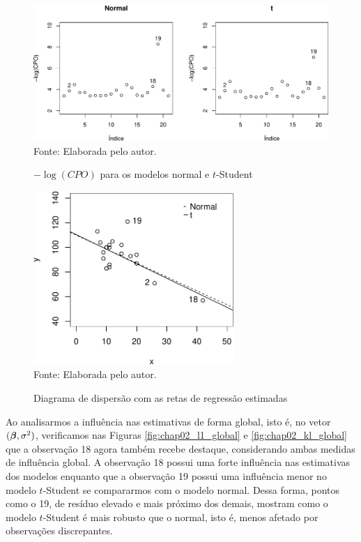 \begin{figure}[h]
\begin{center}
\caption{$-\log(CPO)$ para os modelos normal e $t$-Student}
\label{fig:chap02_cpo}
\includegraphics[width=\textwidth]{figuras/chap02_cpo.pdf}
\\ Fonte: Elaborada pelo autor.
\end{center}
\end{figure}

\begin{figure}[h]
\begin{center}
\caption{Diagrama de dispersão com as retas de regressão estimadas}
\label{fig:chap02_scatter_w_regs}
\includegraphics[width=3in]{figuras/chap02_scatter_w_regs-crop.pdf}
\\ Fonte: Elaborada pelo autor.
\end{center}
\end{figure}

Ao analisarmos a influência nas estimativas de forma global, isto é, no vetor $({\boldsymbol{\beta}},\sigma^2)$, verificamos nas Figuras \ref{fig:chap02_l1_global} e \ref{fig:chap02_kl_global} que a observação 18 agora também recebe destaque, considerando ambas medidas de influência global. A observação 18 possui uma forte influência nas estimativas dos modelos enquanto que a observação 19 possui uma influência menor no modelo $t$-Student se compararmos com o modelo normal. Dessa forma, pontos como o 19, de resíduo elevado e mais próximo dos demais, mostram como o modelo $t$-Student é mais robusto que o normal, isto é, menos afetado por observações discrepantes.

